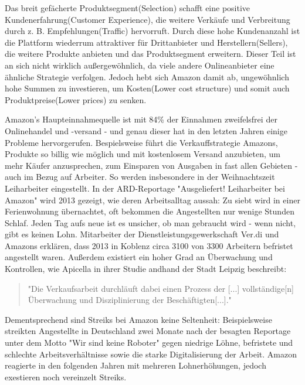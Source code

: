 Das breit gefächerte Produktsegment(Selection) schafft eine positive Kundenerfahrung(Customer Experience), die weitere Verkäufe und Verbreitung durch z. B. Empfehlungen(Traffic) hervorruft. Durch diese hohe Kundenanzahl ist die Plattform wiederrum attraktiver für Drittanbieter und Herstellern(Sellers), die weitere Produkte anbieten und das Produktsegment erweitern. Dieser Teil ist an sich nicht wirklich außergewöhnlich, da viele andere Onlineanbieter eine ähnliche Strategie verfolgen. Jedoch hebt sich Amazon damit ab, ungewöhnlich hohe Summen zu investieren, um Kosten(Lower cost structure) und somit auch Produktpreise(Lower prices) zu senken\cite[S. 26f]{Graf}.


Amazon’s Haupteinnahmequelle ist mit 84\% der Einnahmen zweifelsfrei der Onlinehandel und -versand\cite[Abb. 5]{Desjardins} - und genau dieser hat in den letzten Jahren einige Probleme hervorgerufen. Bespielsweise führt die Verkauffstrategie Amazons, Produkte so billig wie möglich und mit kostenlosem Versand anzubieten, um mehr Käufer anzusprechen\cite{Quartz}, zum Einsparen von Ausgaben in fast allen Gebieten - auch im Bezug auf Arbeiter\cite[S. 6]{Apicella}. So werden insbesondere in der Weihnachtszeit Leiharbeiter eingestellt. In der ARD-Reportage "Ausgeliefert! Leiharbeiter bei Amazon" wird 2013 gezeigt, wie deren Arbeitsalltag aussah: Zu siebt wird in einer Ferienwohnung übernachtet, oft bekommen die Angestellten nur wenige Stunden Schlaf. Jeden Tag aufs neue ist es unsicher, ob man gebraucht wird - wenn nicht, gibt es keinen Lohn. Mitarbeiter der Dienstleistungsgewerkschaft Ver.di und Amazons erklären, dass 2013 in Koblenz circa 3100 von 3300 Arbeitern befristet angestellt waren\cite{Ausgeliefert}.
Außerdem existiert ein hoher Grad an Überwachung und Kontrollen, wie Apicella in ihrer Studie andhand der Stadt Leipzig beschreibt\cite[S. 29]{Apicella}:
\begin{quote}
"Die Verkaufsarbeit durchläuft dabei einen Prozess der [...] vollständige[n] Überwachung und Disziplinierung der Beschäftigten[...]."
\end{quote}
Dementsprechend sind Streiks bei Amazon keine Seltenheit: Beispielsweise streikten Angestellte in Deutschland zwei Monate nach der besagten Reportage unter dem Motto "Wir sind keine Roboter" gegen niedrige Löhne, befristete und schlechte Arbeitsverhältnisse sowie die starke Digitalisierung der Arbeit\cite[S. 6]{Apicella}. Amazon reagierte in den folgenden Jahren mit mehreren Lohnerhöhungen, jedoch exestieren noch vereinzelt Streiks\cite{JGraf}.

